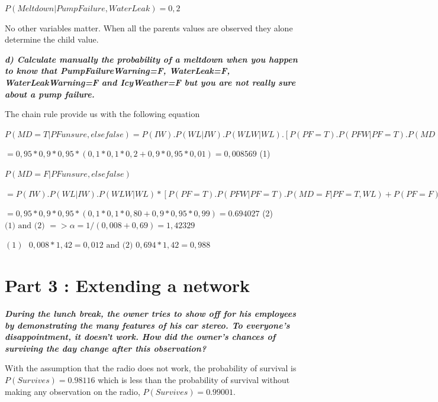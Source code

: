 $P(Meltdown | PumpFailure,WaterLeak ) = 0,2$

No other variables matter.
When all the parents values are observed they alone determine the child value.


\textit{\textbf{d) Calculate manually the probability of a meltdown when you
happen to know that PumpFailureWarning=F, WaterLeak=F, WaterLeakWarning=F and
 IcyWeather=F but you are not really sure about a pump failure.}}

 \vspace{1em}

\begin{center}
The chain rule provide us with the following equation

$P(MD=T|PF unsure,else false)= P(IW).P(WL|IW).P(WLW|WL).[P(PF=T).P(PFW|PF=T).P(MD=T|PF=T,WL)+ P(PF=F).P(PFW|PF=F).P(MD=T|PF=F,WL)]$

$= 0,95*0,9*0,95*(0,1*0,1*0,2 + 0,9*0,95*0,01) = 0,008569$ (1)
\end{center}

\vspace{2em}
\begin{center}
$P(MD=F|PF unsure, else false)$

$=P(IW).P(WL|IW).P(WLW|WL)* [P(PF=T).P(PFW|PF=T).P(MD=F|PF=T,WL) + P(PF=F).P(PFW|PF=F).P(MD=F|PF=F,WL)]$

$= 0,95 * 0,9 * 0,95 * (0,1 * 0,1 * 0,80 + 0,9 * 0,95 * 0,99) =0.694027$ (2)
\vspace{2em}
$\text{(1) and (2) }=> \alpha = 1 / (0,008 + 0,69) = 1,42329 $

$(1)\text{ } 0,008 * 1,42 = 0,012\text{ and (2) }0,694 * 1,42 = 0,988 $

\end{center}




\newpage
\thispagestyle{empty}
\section*{Part 3 : Extending a network}

\textit{\textbf{During the lunch break, the owner tries to show off for his
employees by demonstrating the many features of his car stereo.
To everyone's disappointment, it doesn't work. How did the owner's
chances of surviving the day change after this observation?}}

\vspace{1em}
With the assumption that the radio does not work, the probability of survival
is \textbf{$P(Survives)=0.98116$} which is less than the probability of survival without making any
observation on the radio, \textbf{$P(Survives)=0.99001$}.

